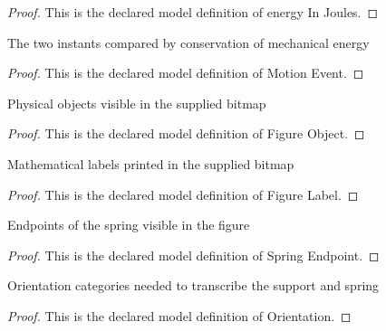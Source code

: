 \begin{proof}
  This is the declared model definition of energy In Joules.
\end{proof}
\begin{definition}
  \label{def:physics:phyx-mini-0279:phyxminiproblems-problemphyxmini0279-motionevent}
  The two instants compared by conservation of mechanical energy
\end{definition}
\begin{proof}
  This is the declared model definition of Motion Event.
\end{proof}
\begin{definition}
  \label{def:physics:phyx-mini-0279:phyxminiproblems-problemphyxmini0279-figureobject}
  Physical objects visible in the supplied bitmap
\end{definition}
\begin{proof}
  This is the declared model definition of Figure Object.
\end{proof}
\begin{definition}
  \label{def:physics:phyx-mini-0279:phyxminiproblems-problemphyxmini0279-figurelabel}
  Mathematical labels printed in the supplied bitmap
\end{definition}
\begin{proof}
  This is the declared model definition of Figure Label.
\end{proof}
\begin{definition}
  \label{def:physics:phyx-mini-0279:phyxminiproblems-problemphyxmini0279-springendpoint}
  Endpoints of the spring visible in the figure
\end{definition}
\begin{proof}
  This is the declared model definition of Spring Endpoint.
\end{proof}
\begin{definition}[Orientation]
  \label{def:physics:phyx-mini-0279:phyxminiproblems-problemphyxmini0279-orientation}
  Orientation categories needed to transcribe the support and spring
\end{definition}
\begin{proof}
  This is the declared model definition of Orientation.
\end{proof}
